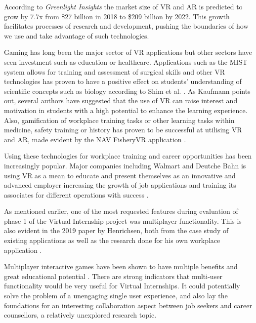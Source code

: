 According to \textit{Greenlight Insights} \cite{forcastVR} the market size of VR and AR is predicted to grow by 7.7x from \$27 billion in 2018 to \$209 billion by 2022. This growth facilitates processes of research and development, pushing the boundaries of how we use and take advantage of such technologies.

Gaming has long been the major sector of VR applications but other sectors have seen investment such as education or healthcare. Applications such as the MIST system \cite{mccloy2001virtual} allows for training and assessment of surgical skills and other VR technologies has proven to have a positive effect on students' understanding of scientific concepts such as biology according to Shim et al. \cite{shim2003application}. As Kaufmann \cite{kaufmann2003collaborative} points out, several authors have suggested that the use of VR can raise interest and motivation in students with a high potential to enhance the learning experience.
Also, gamification of workplace training tasks or other learning tasks within medicine, safety training or history has proven to be successful at utilising VR and AR, made evident by the NAV FisheryVR application \cite{fishfarmNAV}. 

Using these technologies for workplace training and career opportunities has been increasingly popular. Major companies including  Walmart and Deutche Bahn is using VR as a mean to educate and present themselves as an innovative and advanced employer increasing the growth of job applications and training its associates for different operations with success \cite{vasilenko2019virtual}.    

As mentioned earlier, one of the most requested features during evaluation of phase 1 of the Virtual Internship project was multiplayer functionality. This is also evident in the 2019 paper by Henrichsen, both from the case study of existing applications as well as the research done for his own workplace application \cite{henrichsen2019engaging}.

Multiplayer interactive games have been shown to have multiple benefits and great educational potential \cite{ducheneaut2006alone} \cite{nardi2006strangers} \cite{steiner2006play}. There are strong indicators that multi-user functionality would be very useful for Virtual Internships. It could potentially solve the problem of a unengaging single user experience, and also lay the foundations for an interesting collaboration aspect between job seekers and career counsellors, a relatively unexplored research topic.   



